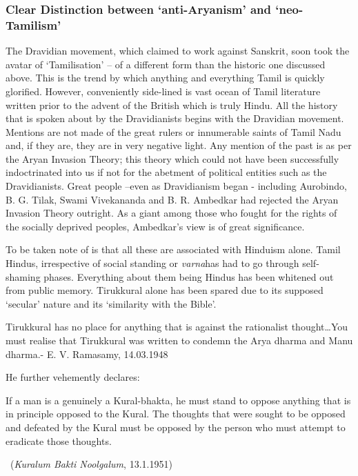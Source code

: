\subsubsection*{Clear Distinction between ‘anti-Aryanism’ and ‘neo-Tamilism’}

The Dravidian movement, which claimed to work against Sanskrit, soon took the avatar of ‘Tamilisation’ – of a different form than the historic one discussed above. This is the trend by which anything and everything Tamil is quickly glorified. However, conveniently side-lined is vast ocean of Tamil literature written prior to the advent of the British which is truly Hindu. All the history that is spoken about by the Dravidianists begins with the Dravidian movement. Mentions are not made of the great rulers or innumerable saints of Tamil Nadu and, if they are, they are in very negative light. Any mention of the past is as per the Aryan Invasion Theory; this theory which could not have been successfully indoctrinated into us if not for the abetment of political entities such as the Dravidianists. Great people –even as Dravidianism began - including Aurobindo, B. G. Tilak, Swami Vivekananda and B. R. Ambedkar had rejected the Aryan Invasion Theory outright. As a giant among those who fought for the rights of the socially deprived peoples, Ambedkar’s view is of great significance. 

To be taken note of is that all these are associated with Hinduism alone. Tamil Hindus, irrespective of social standing or \textit{varna}has had to go through self-shaming phases. Everything about them being Hindus has been whitened out from public memory. Tirukkural alone has been spared due to its supposed ‘secular’ nature and its ‘similarity with the Bible’.

\begin{myquote}
Tirukkural has no place for anything that is against the rationalist thought…You must realise that Tirukkural was written to condemn the Arya dharma and Manu dharma.\hfill - E. V. Ramasamy, 14.03.1948
\end{myquote}

He further vehemently declares:

\begin{myquote}
If a man is a genuinely a Kural-bhakta, he must stand to oppose anything that is in principle opposed to the Kural. The thoughts that were sought to be opposed and defeated by the Kural must be opposed by the person who must attempt to eradicate those thoughts.

~\hfill (\textit{Kuralum Bakti Noolgalum}, 13.1.1951)
\end{myquote}

